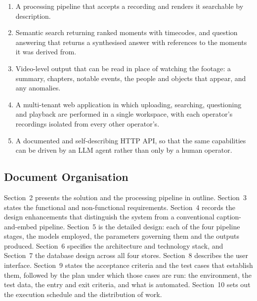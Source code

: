 \begin{enumerate}[label=O-\arabic*.,leftmargin=3.0em]
  \item A processing pipeline that accepts a recording and renders it searchable by
        description.
  \item Semantic search returning ranked moments with timecodes, and question
        answering that returns a synthesised answer with references to the moments it
        was derived from.
  \item Video-level output that can be read in place of watching the footage: a
        summary, chapters, notable events, the people and objects that appear, and
        any anomalies.
  \item A multi-tenant web application in which uploading, searching, questioning and
        playback are performed in a single workspace, with each operator's recordings
        isolated from every other operator's.
  \item A documented and self-describing HTTP API, so that the same capabilities can
        be driven by an LLM agent rather than only by a human operator.
\end{enumerate}

\subsection{Document Organisation}

Section~2 presents the solution and the processing pipeline in outline. Section~3 states
the functional and non-functional requirements. Section~4 records the design
enhancements that distinguish the system from a conventional caption-and-embed pipeline.
Section~5 is the detailed design: each of the four pipeline stages, the models employed,
the parameters governing them and the outputs produced. Section~6 specifies the
architecture and technology stack, and Section~7 the database design across all four
stores. Section~8 describes the user interface. Section~9 states the acceptance criteria
and the test cases that establish them, followed by the plan under which those cases are
run: the environment, the test data, the entry and exit criteria, and what is automated.
Section~10 sets out the execution schedule and the distribution of work.
